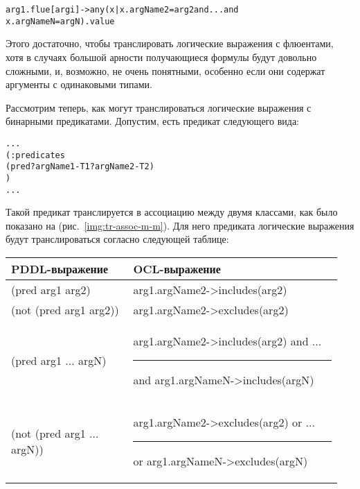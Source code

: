 \begin{alltt}
arg1.flue[argi]->any(x | x.argName2 = arg2 and ... and
                         x.argNameN = argN).value
\end{alltt}

Этого достаточно, чтобы транслировать логические выражения с флюентами, хотя в случаях большой арности получающиеся формулы будут довольно сложными, и, возможно, не очень понятными, особенно если они содержат аргументы с одинаковыми типами.


Рассмотрим теперь, как могут транслироваться логические выражения с бинарными предикатами. Допустим, есть предикат следующего вида:

\begin{mdframed}[style=excode]
\begin{alltt}
  ...
  (:predicates
    (pred ?argName1 - T1 ?argName2 - T2)
  )
  ...
\end{alltt}
\end{mdframed}

Такой предикат транслируется в ассоциацию между двумя классами, как было показано на (рис.~\ref{img:tr-assoc-m-m}). 
Для него предиката логические выражения будут транслироваться согласно следующей таблице:
\\

{
    \renewcommand{\arraystretch}{1.3}
    \small
    \centering
    \ttfamily
    \begin{tabular}{|p{0.35\linewidth}|p{0.60\linewidth}|}
        \hline
        \normalfont\bfseries PDDL\:-выражение & \normalfont\bfseries OCL\:-выражение \\
        \hline
          (pred arg1 arg2) & arg1.argName2->includes(arg2) \\
        \hline
          (not (pred arg1 arg2)) & arg1.argName2->excludes(arg2)\\
        \hline
          (pred arg1 ... argN) 
          & 
          arg1.argName2->includes(arg2) and ...\newline
          \rule{2em}{0em} and arg1.argNameN->includes(argN) \\
        \hline
          (not (pred arg1 ... argN))
          &
          arg1.argName2->excludes(arg2) or ...\newline
          \rule{2em}{0em} or arg1.argNameN->excludes(argN) \\
        \hline

    \end{tabular}
}
\\[5pt]

